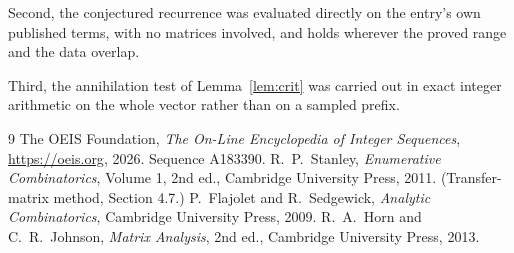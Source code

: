 \documentclass[11pt,a4paper]{article}
\theoremstyle{plain}
\theoremstyle{definition}
\begin{document}
Second, the conjectured recurrence was evaluated directly on the entry's own published terms,
with no matrices involved, and holds wherever the proved range and the data overlap.

Third, the annihilation test of Lemma~\ref{lem:crit} was carried out in exact integer
arithmetic on the whole vector rather than on a sampled prefix.

\begin{thebibliography}{9}
 The OEIS Foundation, \emph{The On-Line Encyclopedia of Integer
Sequences}, \url{https://oeis.org}, 2026. Sequence A183390.
 R.~P.~Stanley, \emph{Enumerative Combinatorics}, Volume 1, 2nd ed.,
Cambridge University Press, 2011. (Transfer-matrix method, Section 4.7.)
 P.~Flajolet and R.~Sedgewick, \emph{Analytic Combinatorics}, Cambridge
University Press, 2009.
 R.~A.~Horn and C.~R.~Johnson, \emph{Matrix Analysis}, 2nd ed., Cambridge
University Press, 2013.
\end{thebibliography}
\end{document}
